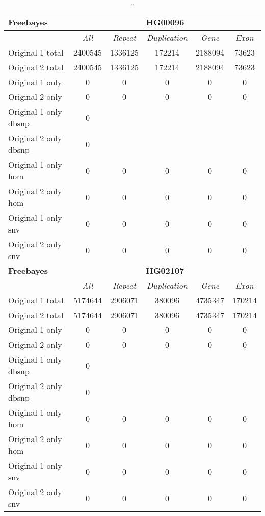 \begin{table}[htb]
\begin{center}
\begin{tabular}{|l|c||c|c|c|c|}
\hline
{\bf Freebayes} & \multicolumn{5}{|c|}{\bf HG00096} \\
\hline
\cline{2-6}
{\bf} & {\it All} & {\it Repeat} & {\it Duplication} & {\it Gene} & {\it Exon} \\
\hline
Original 1 total & 2400545 & 1336125 & 172214 & 2188094 & 73623\\ 
\hline
Original 2 total & 2400545 & 1336125 & 172214 & 2188094 & 73623\\ 
\hline
Original 1 only & 0 & 0 & 0 & 0 & 0\\ 
\hline
Original 2 only & 0 & 0 & 0 & 0 & 0\\ 
\hline
Original 1 only dbsnp & 0 &  &  &  & \\ 
\hline
Original 2 only dbsnp & 0 &  &  &  & \\ 
\hline
Original 1 only hom & 0 & 0 & 0 & 0 & 0\\ 
\hline
Original 2 only hom & 0 & 0 & 0 & 0 & 0\\ 
\hline
Original 1 only snv & 0 & 0 & 0 & 0 & 0\\ 
\hline
Original 2 only snv & 0 & 0 & 0 & 0 & 0\\ 
\hline
\hline
{\bf Freebayes} & \multicolumn{5}{|c|}{\bf HG02107} \\
\hline
\cline{2-6}
{\bf} & {\it All} & {\it Repeat} & {\it Duplication} & {\it Gene} & {\it Exon} \\
\hline
Original 1 total & 5174644 & 2906071 & 380096 & 4735347 & 170214\\ 
\hline
Original 2 total & 5174644 & 2906071 & 380096 & 4735347 & 170214\\ 
\hline
Original 1 only & 0 & 0 & 0 & 0 & 0\\ 
\hline
Original 2 only & 0 & 0 & 0 & 0 & 0\\ 
\hline
Original 1 only dbsnp & 0 &  &  &  & \\ 
\hline
Original 2 only dbsnp & 0 &  &  &  & \\ 
\hline
Original 1 only hom & 0 & 0 & 0 & 0 & 0\\ 
\hline
Original 2 only hom & 0 & 0 & 0 & 0 & 0\\ 
\hline
Original 1 only snv & 0 & 0 & 0 & 0 & 0\\ 
\hline
Original 2 only snv & 0 & 0 & 0 & 0 & 0\\ 
\hline
\end{tabular}
\end{center}
\caption{ .. }
\label{tab:orig-vs-orig2-freebayes}
\end{table}

